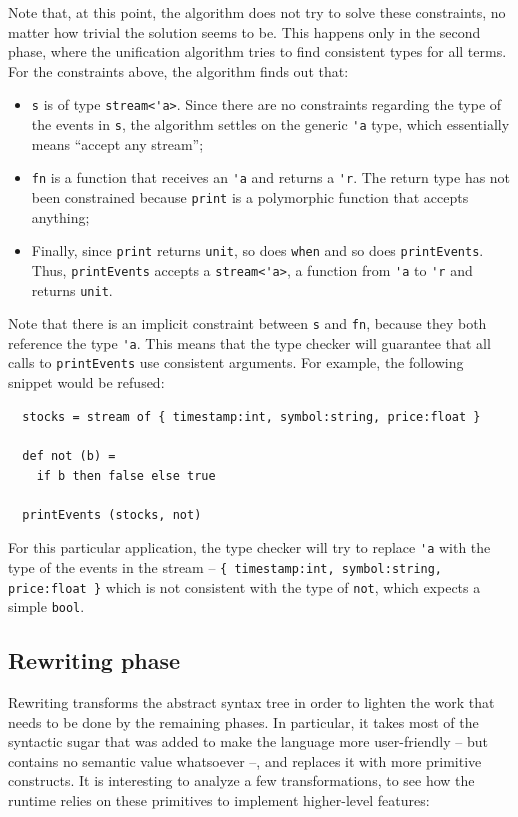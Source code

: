 Note that, at this point, the algorithm does not try to solve these
constraints, no matter how trivial the solution seems to be. This
happens only in the second phase, where the unification algorithm
tries to find consistent types for all terms. For the constraints
above, the algorithm finds out that:

\begin{itemize}
\item \verb=s= is of type \verb=stream<'a>=. Since there are no
  constraints regarding the type of the events in \verb=s=, the
  algorithm settles on the generic \verb='a= type, which essentially
  means ``accept any stream'';
\item \verb=fn= is a function that receives an \verb='a= and returns a
  \verb='r=. The return type has not been constrained because
  \verb=print= is a polymorphic function that accepts anything;
\item Finally, since \verb=print= returns \verb=unit=, so does
  \verb=when= and so does \verb=printEvents=. Thus, \verb=printEvents=
  accepts a \verb=stream<'a>=, a function from \verb='a= to \verb='r=
  and returns \verb=unit=.
\end{itemize}

Note that there is an implicit constraint between \verb=s= and
\verb=fn=, because they both reference the type \verb='a=. This means
that the type checker will guarantee that all calls to
\verb=printEvents= use consistent arguments. For example, the
following snippet would be refused:

\begin{lstlisting}
  stocks = stream of { timestamp:int, symbol:string, price:float }

  def not (b) =
    if b then false else true

  printEvents (stocks, not)
\end{lstlisting}

For this particular application, the type checker will try to replace
\verb='a= with the type of the events in the stream --
\verb={ timestamp:int, symbol:string, price:float }= which is not
consistent with the type of \verb=not=, which expects a simple
\verb=bool=.

\subsection{Rewriting phase}
\label{sub:rewriting}

Rewriting transforms the abstract syntax tree in order to lighten the
work that needs to be done by the remaining phases. In particular, it
takes most of the syntactic sugar that was added to make the language
more user-friendly -- but contains no semantic value whatsoever --,
and replaces it with more primitive constructs. It is interesting to
analyze a few transformations, to see how the runtime relies on these
primitives to implement higher-level features:

